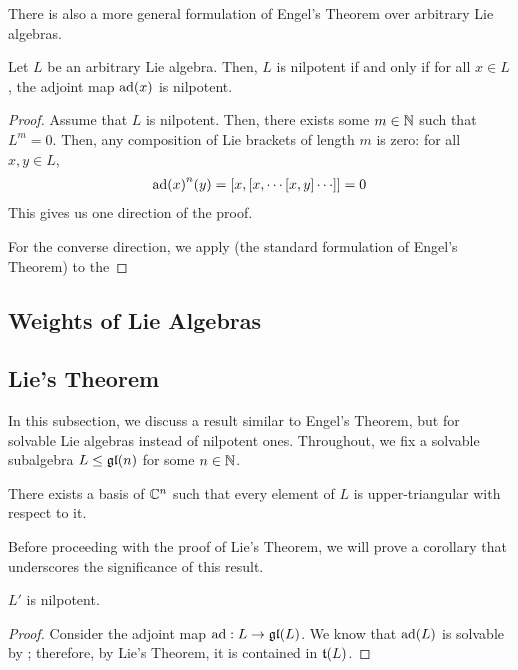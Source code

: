 There is also a more general formulation of Engel's Theorem over arbitrary Lie algebras.

\begin{boxtheorem}\label{Ch1:Thm:EngelOverAnyLie}
    Let $L$ be an arbitrary Lie algebra. Then, $L$ is nilpotent if and only if for all $x \in L$, the adjoint map $\operatorname{ad}\!\left( x \right)$ is nilpotent.
\end{boxtheorem}
\begin{proof}
    Assume that $L$ is nilpotent. Then, there exists some $m \in \mathbb{N}$ such that $L^m = 0$. Then, any composition of Lie brackets of length $m$ is zero: for all $x, y \in L$,
    \begin{align*}
        \pad{x}^n\!(y) = \brac{x, \brac{x, \cdots \brac{x, y}\cdots}} = 0
    \end{align*}
    This gives us one direction of the proof.

    For the converse direction, we apply  (the standard formulation of Engel's Theorem) to the \sorry
\end{proof}

\subsection{Weights of Lie Algebras}

\subsection{Lie's Theorem}

In this subsection, we discuss a result similar to Engel's Theorem, but for solvable Lie algebras instead of nilpotent ones. Throughout, we fix a solvable subalgebra $L \leq \mathfrak{gl}\!\left( n \right)$ for some $n \in \mathbb{N}$.

\begin{boxtheorem}\label{Ch1:Thm:Lie}
    There exists a basis of $\mathbb{C}^n$ such that every element of $L$ is upper-triangular with respect to it.
\end{boxtheorem}

Before proceeding with the proof of Lie's Theorem, we will prove a corollary that underscores the significance of this result.

\begin{boxcorollary}\label{Ch1:Cor:SolvableDerivNilpotent}
    $L'$ is nilpotent.
\end{boxcorollary}
\begin{proof}
    Consider the adjoint map $\operatorname{ad} : L \to \mathfrak{gl}\!\left( L \right)$. We know that $\operatorname{ad}\!\left( L \right)$ is solvable by \sorry; therefore, by Lie's Theorem, it is contained in $\mathfrak{t}\!\left( L \right)$. %
    \sorry
\end{proof}
